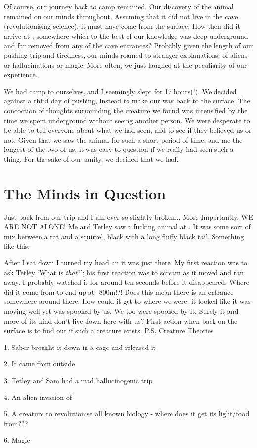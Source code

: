 Of course, our journey back to camp remained. Our discovery of the animal remained on our minds throughout. Assuming that it did not live in the cave (revolutionising science), it must have come from the surface. How then did it arrive at , somewhere which to the best of our knowledge was deep underground and far removed from any of the cave entrances? Probably given the length of our pushing trip and tiredness, our minds roamed to stranger explanations, of aliens or hallucinations or magic. More often, we just laughed at the peculiarity of our experience. 

We had camp to ourselves, and I seemingly slept for 17 hours(!). We decided against a third day of pushing, instead to make our way back to the surface. The concoction of thoughts surrounding the creature we found was intensified by the time we spent underground without seeing another person. We were desperate to be able to tell everyone about what we had seen, and to see if they believed us or not. Given that we saw the animal for such a short period of time, and me the longest of the two of us, it was easy to question if we really had seen such a thing. For the sake of our sanity, we decided that we had. 


\section{The Minds in Question}

Just back from our trip and I am ever so slightly broken...
More Importantly, WE ARE NOT ALONE! Me and Tetley saw a fucking animal at . It was some sort of mix between a rat and a squirrel, black with a long fluffy black tail. Something like this. 

After I sat down I turned my head an it was just there. My first reaction was to ask Tetley `What is \emph{that}?'; his first reaction was to scream as it moved and ran away. I probably watched it for around ten seconds before it disappeared. Where did it come from to end up at -800m!?! Does this mean there is an entrance somewhere around there. How could it get to where we were; it looked like it was moving well yet was spooked by us. We too were spooked by it. Surely it and more of its kind don't live down here with us? First action when back on the surface is to find out if such a creature exists.
P.S. Creature Theories
\begin{citemize}
\item 1. Saber brought it down in a cage and released it
\item 2. It came from outside
\item 3. Tetley and Sam had a mad hallucinogenic trip
\item 4. An alien invasion of 
\item 5. A creature to revolutionise all known biology - where does it get its light/food from???
\item 6. Magic
\end{citemize}

